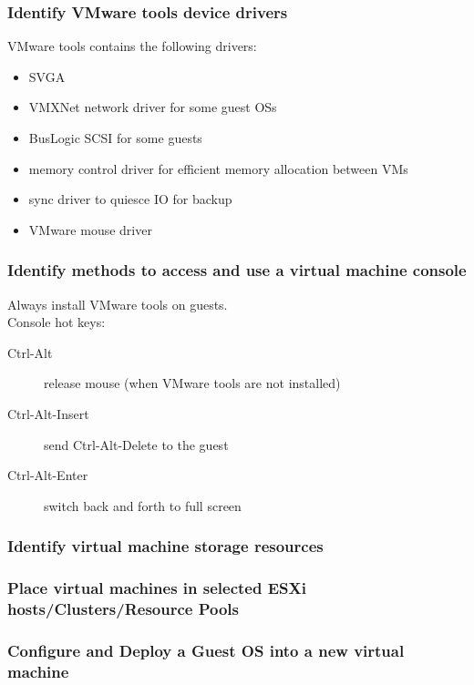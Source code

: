 \subsubsection{Identify VMware tools device drivers}

VMware tools contains the following drivers:

\begin{itemize}
\item SVGA
\item VMXNet network driver for some guest OSs
\item BusLogic SCSI for some guests
\item memory control driver for efficient memory allocation between VMs
\item sync driver to quiesce IO for backup
\item VMware mouse driver
\end{itemize}

\subsubsection{Identify methods to access and use a virtual machine console}

Always install VMware tools on guests.\\

Console hot keys:

\begin{description}

\item[Ctrl-Alt]
release mouse (when VMware tools are not installed)

\item[Ctrl-Alt-Insert]
send Ctrl-Alt-Delete to the guest

\item[Ctrl-Alt-Enter]
switch back and forth to full screen

\end{description}

\subsubsection{Identify virtual machine storage resources}

\subsubsection{Place virtual machines in selected ESXi hosts/Clusters/Resource Pools}

\subsubsection{Configure and Deploy a Guest OS into a new virtual machine}

